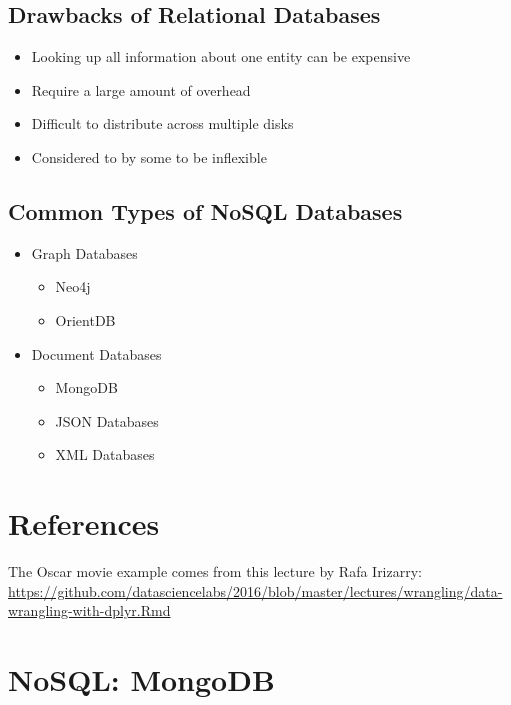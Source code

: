 \documentclass[]{book}
\providecommand{\tightlist}{%
  \setlength{\itemsep}{0pt}\setlength{\parskip}{0pt}}
\theoremstyle{definition}
\theoremstyle{definition}
\theoremstyle{definition}
\theoremstyle{remark}
\begin{document}
\subsection{Drawbacks of Relational
Databases}\label{drawbacks-of-relational-databases}

\begin{itemize}
\tightlist
\item
  Looking up all information about one entity can be expensive
\item
  Require a large amount of overhead
\item
  Difficult to distribute across multiple disks
\item
  Considered to by some to be inflexible
\end{itemize}

\subsection{Common Types of NoSQL
Databases}\label{common-types-of-nosql-databases}

\begin{itemize}
\tightlist
\item
  Graph Databases

  \begin{itemize}
  \tightlist
  \item
    Neo4j
  \item
    OrientDB
  \end{itemize}
\item
  Document Databases

  \begin{itemize}
  \tightlist
  \item
    MongoDB
  \item
    JSON Databases
  \item
    XML Databases
  \end{itemize}
\end{itemize}

\section{References}\label{references}

The Oscar movie example comes from this lecture by Rafa Irizarry:
\url{https://github.com/datasciencelabs/2016/blob/master/lectures/wrangling/data-wrangling-with-dplyr.Rmd}

\section{NoSQL: MongoDB}\label{nosql-mongodb}
\end{document}
